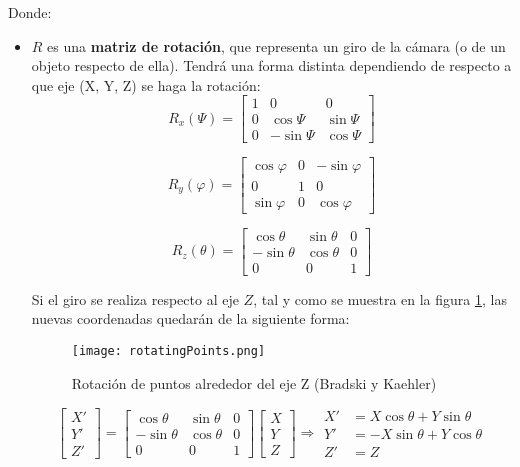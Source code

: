 Donde: 
\begin{itemize}

\item $R$ es una \textbf{matriz de rotación}, que representa un giro de la cámara (o de un objeto respecto de ella). Tendrá una forma distinta dependiendo de respecto a que eje (X, Y, Z) se haga la rotación:
\begin{equation}
R_x(\Psi)=\begin{bmatrix}
1 & 0         & 0        \\ 
0 & \cos\Psi  & \sin\Psi \\ 
0 & -\sin\Psi & \cos\Psi
\end{bmatrix}
\end{equation}

\begin{equation}
R_y(\varphi)=\begin{bmatrix}
\cos\varphi & 0 & -\sin\varphi \\ 
0           & 1 & 0            \\ 
\sin\varphi & 0 & \cos\varphi
\end{bmatrix}
\end{equation}

\begin{equation}
R_z(\theta)=\begin{bmatrix}
\cos\theta  & \sin\theta & 0 \\ 
-\sin\theta & \cos\theta & 0 \\ 
0           & 0          & 1
\end{bmatrix}
\end{equation}

Si el giro se realiza respecto al eje $Z$, tal y como se muestra en la figura \ref{fig:rotatingPoints}, las nuevas coordenadas quedarán de la siguiente forma:

\begin{figure}[h]
  \centering
  \texttt{[image: rotatingPoints.png]}
  \caption{Rotación de puntos alrededor del eje Z (Bradski y Kaehler)}
  \label{fig:rotatingPoints}
\end{figure}

\begin{equation}
\begin{bmatrix}
X'\\ 
Y'\\ 
Z'
\end{bmatrix}
=
\begin{bmatrix}
\cos\theta  & \sin\theta & 0 \\ 
-\sin\theta & \cos\theta & 0 \\ 
0           & 0          & 1
\end{bmatrix}
\begin{bmatrix}
X\\ 
Y\\ 
Z
\end{bmatrix}
\Rightarrow 
\begin{aligned}
X'&= X\cos\theta + Y \sin\theta \\ 
Y'&=-X\sin\theta + Y \cos\theta \\ 
Z'&= Z
\end{aligned}
\end{equation}


\end{itemize}
